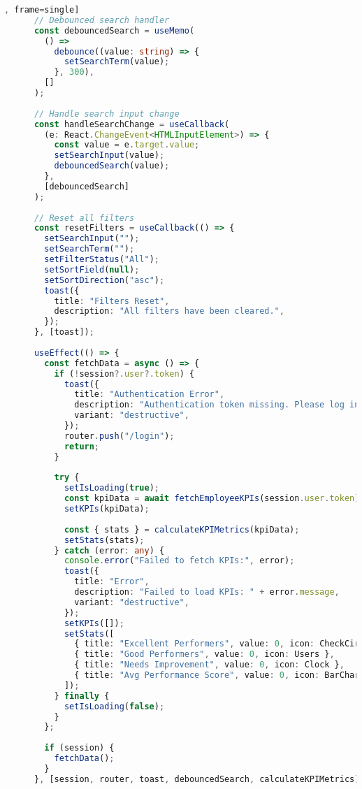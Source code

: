\begin{lstlisting}[language=Typescript, caption=src/app/protected/kpi/page.tsx [front-end], frame=single]
      // Debounced search handler
      const debouncedSearch = useMemo(
        () =>
          debounce((value: string) => {
            setSearchTerm(value);
          }, 300),
        []
      );
    
      // Handle search input change
      const handleSearchChange = useCallback(
        (e: React.ChangeEvent<HTMLInputElement>) => {
          const value = e.target.value;
          setSearchInput(value);
          debouncedSearch(value);
        },
        [debouncedSearch]
      );
    
      // Reset all filters
      const resetFilters = useCallback(() => {
        setSearchInput("");
        setSearchTerm("");
        setFilterStatus("All");
        setSortField(null);
        setSortDirection("asc");
        toast({
          title: "Filters Reset",
          description: "All filters have been cleared.",
        });
      }, [toast]);
    
      useEffect(() => {
        const fetchData = async () => {
          if (!session?.user?.token) {
            toast({
              title: "Authentication Error",
              description: "Authentication token missing. Please log in again.",
              variant: "destructive",
            });
            router.push("/login");
            return;
          }
    
          try {
            setIsLoading(true);
            const kpiData = await fetchEmployeeKPIs(session.user.token);
            setKPIs(kpiData);
    
            const { stats } = calculateKPIMetrics(kpiData);
            setStats(stats);
          } catch (error: any) {
            console.error("Failed to fetch KPIs:", error);
            toast({
              title: "Error",
              description: "Failed to load KPIs: " + error.message,
              variant: "destructive",
            });
            setKPIs([]);
            setStats([
              { title: "Excellent Performers", value: 0, icon: CheckCircle },
              { title: "Good Performers", value: 0, icon: Users },
              { title: "Needs Improvement", value: 0, icon: Clock },
              { title: "Avg Performance Score", value: 0, icon: BarChart },
            ]);
          } finally {
            setIsLoading(false);
          }
        };
    
        if (session) {
          fetchData();
        }
      }, [session, router, toast, debouncedSearch, calculateKPIMetrics]);
    

\end{lstlisting}
